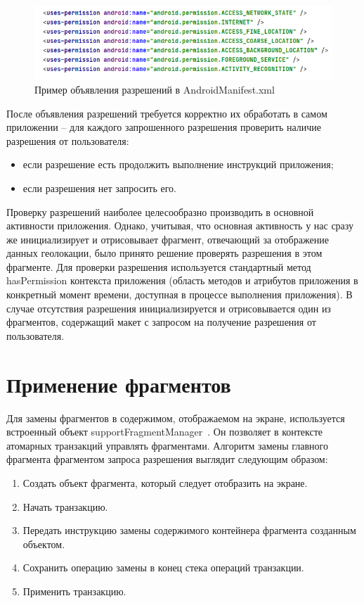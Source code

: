 \smallskip
\begin{figure}[H]
	\centering
	\includegraphics[width=\textwidth]{flesh/somefunc/manifest_permissions.png}
	\caption{\label{fig:manifest_permissions}Пример объявления разрешений в AndroidManifest.xml}
\end{figure}


После объявления разрешений требуется корректно их обработать в самом приложении – для каждого запрошенного разрешения проверить наличие разрешения от пользователя:
\begin{itemize}
	\item если разрешение есть \textendash\space продолжить выполнение инструкций приложения;
	\item если разрешения нет \textendash\space запросить его.
\end{itemize}
\smallskip


Проверку разрешений наиболее целесообразно производить в основной активности приложения. Однако, учитывая, что основная активность у нас сразу же инициализирует и отрисовывает фрагмент, отвечающий за отображение данных геолокации, было принято решение проверять разрешения в этом фрагменте.
Для проверки разрешения используется стандартный метод hasPermission контекста приложения (область методов и атрибутов приложения в конкретный момент времени, доступная в процессе выполнения приложения). 
В случае отсутствия разрешения инициализируется и отрисовывается один из фрагментов, содержащий макет с запросом на получение разрешения от пользователя. 

\section{Применение фрагментов}
Для замены фрагментов в содержимом, отображаемом на экране, используется встроенный объект supportFragmentManager~\autocite{android_fragment_manager}. Он позволяет в контексте атомарных транзакций управлять фрагментами. Алгоритм замены главного фрагмента фрагментом запроса разрешения выглядит следующим образом:
\begin{enumerate}
	\item Создать объект фрагмента, который следует отобразить на экране.
	\item Начать транзакцию.
	\item Передать инструкцию замены содержимого контейнера фрагмента созданным объектом.
	\item Сохранить операцию замены в конец стека операций транзакции.
	\item Применить транзакцию.
\end{enumerate}


